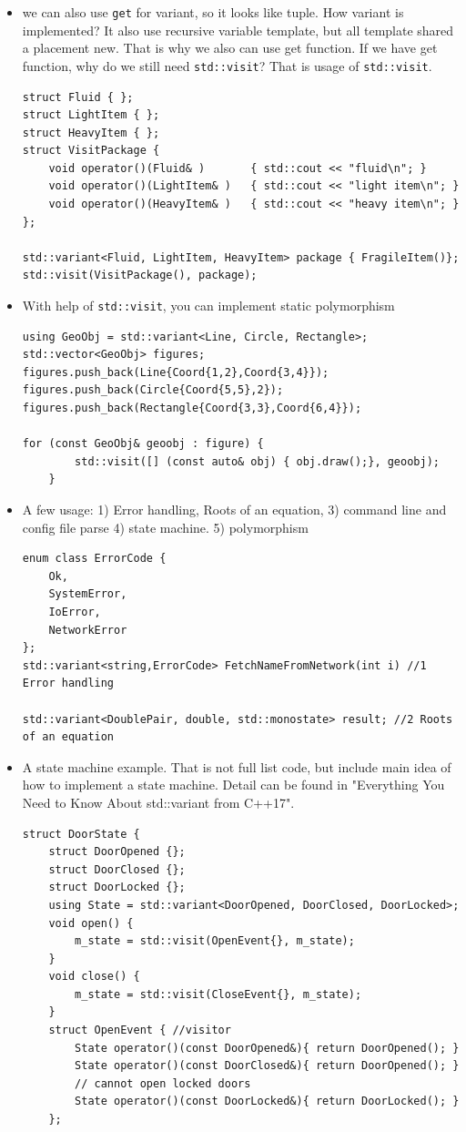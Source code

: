\documentclass[a4paper,11pt,twoside]{book}
\begin{document}
\begin{itemize}
	\item we can also use \texttt{get} for variant, so it looks like tuple. How variant is implemented? It also use recursive variable template, but all template shared a placement new. That is why we also can use get function. If we have get function, why do we still need \texttt{std::visit}? That is usage of \texttt{std::visit}.
\begin{lstlisting}
struct Fluid { };
struct LightItem { };
struct HeavyItem { };
struct VisitPackage {
	void operator()(Fluid& )       { std::cout << "fluid\n"; }
	void operator()(LightItem& )   { std::cout << "light item\n"; }
	void operator()(HeavyItem& )   { std::cout << "heavy item\n"; }
};

std::variant<Fluid, LightItem, HeavyItem> package { FragileItem()};
std::visit(VisitPackage(), package);
\end{lstlisting}	
	
	\item With help of \texttt{std::visit}, you can implement static polymorphism
	
\begin{lstlisting}
using GeoObj = std::variant<Line, Circle, Rectangle>;
std::vector<GeoObj> figures;
figures.push_back(Line{Coord{1,2},Coord{3,4}});
figures.push_back(Circle{Coord{5,5},2});  
figures.push_back(Rectangle{Coord{3,3},Coord{6,4}});  

for (const GeoObj& geoobj : figure) {
		std::visit([] (const auto& obj) { obj.draw();}, geoobj);
	}
\end{lstlisting}	
	
	\item A few usage: 1) Error handling, Roots of an equation, 3) command line and config file parse 4) state machine. 5) polymorphism
	
\begin{lstlisting}
enum class ErrorCode {
	Ok,
	SystemError,
	IoError,
	NetworkError
};
std::variant<string,ErrorCode> FetchNameFromNetwork(int i) //1 Error handling

std::variant<DoublePair, double, std::monostate> result; //2 Roots of an equation	
\end{lstlisting}	
	
	\item A state machine example. That is not full list code, but include main idea of how to implement a state machine. Detail can be found in "Everything You Need to Know About std::variant from C++17".
\begin{lstlisting}
struct DoorState {
	struct DoorOpened {};
	struct DoorClosed {};
	struct DoorLocked {};
	using State = std::variant<DoorOpened, DoorClosed, DoorLocked>;
	void open() {
		m_state = std::visit(OpenEvent{}, m_state);
	}
	void close() {
		m_state = std::visit(CloseEvent{}, m_state);
	}	
	struct OpenEvent { //visitor
		State operator()(const DoorOpened&){ return DoorOpened(); }
		State operator()(const DoorClosed&){ return DoorOpened(); }
		// cannot open locked doors
		State operator()(const DoorLocked&){ return DoorLocked(); } 
	};
	

\end{lstlisting}
\end{itemize}
\end{document}
